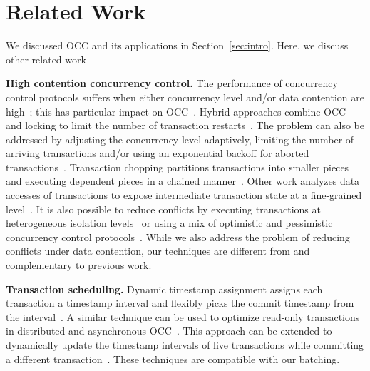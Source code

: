 \section{Related Work}\label{sec:relwork}
We discussed OCC and its applications in Section~\ref{sec:intro}. 
Here, we discuss other related work

{\bf High contention concurrency control.}
The performance of concurrency control protocols suffers when either concurrency level and/or data contention are high~\cite{franaszek1985limitations, appuswamy17vldb}; this has particular impact on OCC~\cite{agrawal1987concurrency}. Hybrid approaches combine OCC and locking to limit the number of transaction restarts~\cite{thomasian1998distributed,yu1992analysis}. The problem can also be addressed by adjusting the concurrency level adaptively, limiting the number of arriving transactions and/or using an exponential backoff for aborted transactions~. Transaction chopping partitions transactions into smaller pieces and executing dependent pieces in a chained manner~\cite{mu2014extracting,shasha1995transaction,xie2015high}. Other work analyzes data accesses of transactions to expose intermediate transaction state at a fine-grained level~\cite{wang2016scaling}. It is also possible to reduce conflicts by executing transactions at heterogeneous isolation levels~\cite{xie2014salt,xie2015high} or using a mix of optimistic and pessimistic concurrency control protocols~\cite{wang2016mostly}.
While we also address the problem of reducing conflicts under data contention, our techniques are different from and complementary to previous work.

{\bf Transaction scheduling.}
Dynamic timestamp assignment assigns each transaction a timestamp interval and flexibly picks the commit timestamp from the interval~\cite{bayer1982dynamic}. A similar technique can be used to optimize read-only transactions in distributed and asynchronous OCC~\cite{ding2015centiman}. This approach can be extended to dynamically update the timestamp intervals of live transactions while committing a different transaction~\cite{boksenbaum1987concurrent}.
 These techniques are compatible with our batching.

